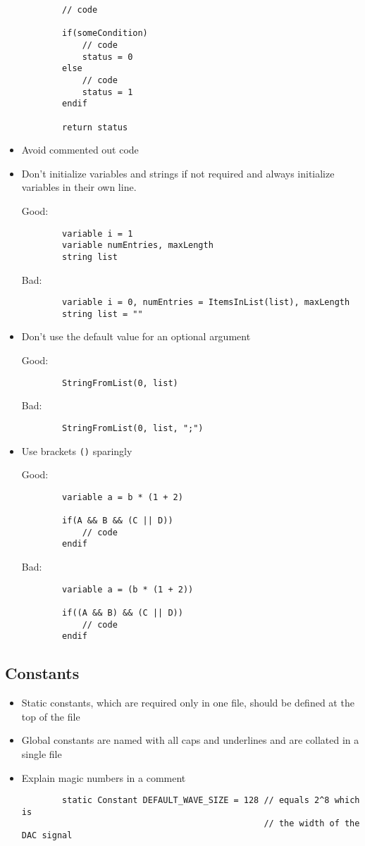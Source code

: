 \documentclass{scrartcl}
\begin{document}
\begin{itemize}
\begin{minipage}{\textwidth}
\begin{verbatim}
		// code
		
		if(someCondition)
			// code
			status = 0
		else
			// code
			status = 1
		endif
		
		return status
	\end{verbatim}
	\end{minipage}
%
	\item Avoid commented out code
%
	\item Don't initialize variables and strings if not required and always initialize variables in their own line.\par
	Good:
	\begin{verbatim}
		variable i = 1
		variable numEntries, maxLength
		string list
	\end{verbatim}
	Bad:
	\begin{verbatim}
		variable i = 0, numEntries = ItemsInList(list), maxLength
		string list = ""
	\end{verbatim}	
%
	\item Don't use the default value for an optional argument\par
	Good:
	\begin{verbatim}
		StringFromList(0, list)
	\end{verbatim}
	Bad:
	\begin{verbatim}
		StringFromList(0, list, ";")
	\end{verbatim}
%
	\item Use brackets \texttt{()} sparingly\par
	Good:
	\begin{verbatim}
		variable a = b * (1 + 2)
		
		if(A && B && (C || D))
			// code
		endif
	\end{verbatim}
	\begin{minipage}{\textwidth}
	Bad:
	\begin{verbatim}
		variable a = (b * (1 + 2))
		
		if((A && B) && (C || D))
			// code
		endif
	\end{verbatim}
	\end{minipage}
	\end{itemize}
\subsection{Constants}
%
\begin{itemize}
	\item Static constants, which are required only in one file, should be defined at the top of the file
%
	\item Global constants are named with all caps and underlines and are collated in a single file
%
	\item Explain magic numbers in a comment
	\begin{verbatim}
		static Constant DEFAULT_WAVE_SIZE = 128 // equals 2^8 which is
		                                        // the width of the DAC signal
	\end{verbatim}
\end{itemize}
%
\end{document}
